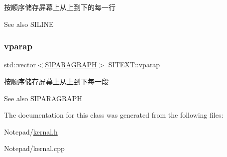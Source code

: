 按顺序储存屏幕上从上到下的每一行 

\begin{DoxySeeAlso}{See also}
S\+I\+L\+I\+NE 
\end{DoxySeeAlso}
\mbox{\label{class_s_i_t_e_x_t_aeeeed4da4b7633b913a7a98336a91d75}} 
\subsubsection{\texorpdfstring{vparap}{vparap}}
{\footnotesize\ttfamily std\+::vector$<$\hyperlink{struct_s_i_r_a_n_g_e}{S\+I\+P\+A\+R\+A\+G\+R\+A\+PH}$>$ S\+I\+T\+E\+X\+T\+::vparap}



按顺序储存屏幕上从上到下每一段 

\begin{DoxySeeAlso}{See also}
S\+I\+P\+A\+R\+A\+G\+R\+A\+PH 
\end{DoxySeeAlso}


The documentation for this class was generated from the following files\+:\begin{DoxyCompactItemize}
\item 
Notepad/\hyperlink{kernal_8h}{kernal.\+h}\item 
Notepad/kernal.\+cpp\end{DoxyCompactItemize}
